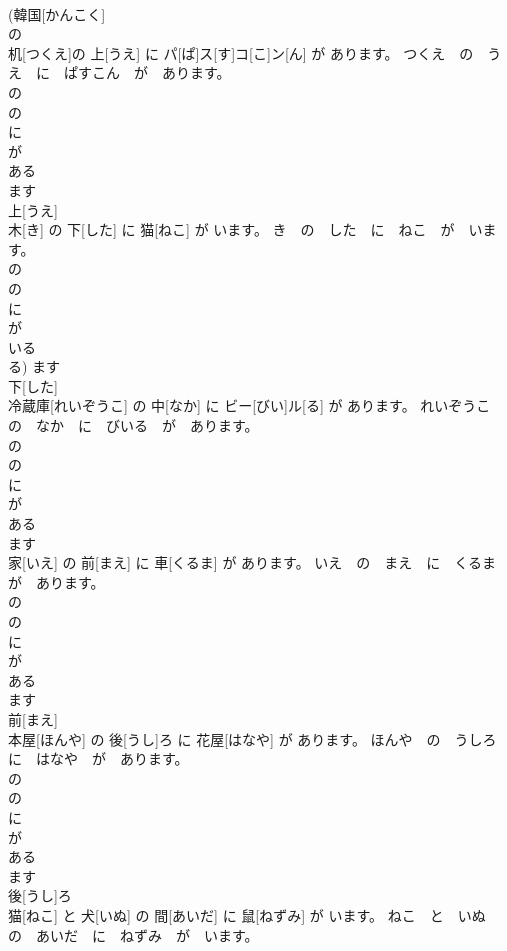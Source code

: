 \documentclass[8pt]{extreport}
\begin{document}
\begin{CJK}{UTF8}{min}
\\	(韓国[かんこく] 
\\	の 
\\	机[つくえ]の 上[うえ] に パ[ぱ]ス[す]コ[こ]ン[ん] が あります。	つくえ　の　うえ　に　ぱすこん　が　あります。	
\\	の 
\\	の 
\\	に 
\\	が 
\\	ある 
\\	ます 
\\	上[うえ] 
\\	木[き] の 下[した] に 猫[ねこ] が います。	き　の　した　に　ねこ　が　います。	
\\	の 
\\	の 
\\	に 
\\	が 
\\	いる 
\\	る)	ます 
\\	下[した] 
\\	冷蔵庫[れいぞうこ] の 中[なか] に ビー[びい]ル[る] が あります。	れいぞうこ　の　なか　に　びいる　が　あります。	
\\	の 
\\	の 
\\	に 
\\	が 
\\	ある 
\\	ます 
\\	家[いえ] の 前[まえ] に 車[くるま] が あります。	いえ　の　まえ　に　くるま　が　あります。	
\\	の 
\\	の 
\\	に 
\\	が 
\\	ある 
\\	ます 
\\	前[まえ] 
\\	本屋[ほんや] の 後[うし]ろ に 花屋[はなや] が あります。	ほんや　の　うしろ　に　はなや　が　あります。	
\\	の 
\\	の 
\\	に 
\\	が 
\\	ある 
\\	ます 
\\	後[うし]ろ 
\\	猫[ねこ] と 犬[いぬ] の 間[あいだ] に 鼠[ねずみ] が います。	ねこ　と　いぬ　の　あいだ　に　ねずみ　が　います。	

\end{CJK}
\end{document}
